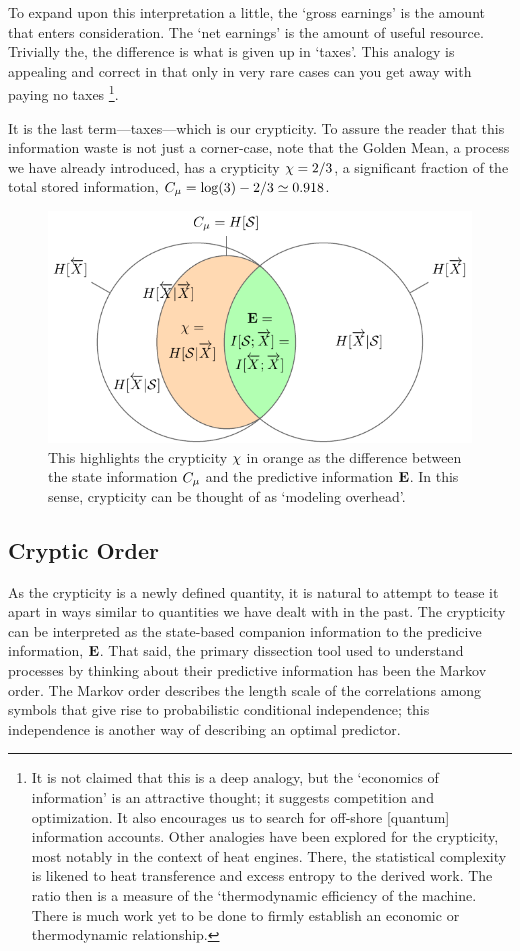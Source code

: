 To expand upon this interpretation a little, the `gross earnings' is the amount that enters consideration. The `net earnings' is the amount of useful resource. Trivially the, the difference is what is given up in `taxes'. This analogy is appealing and correct in that only in very rare cases can you get away with paying no taxes \footnote{It is not claimed that this is a deep analogy, but the `economics of information' is an attractive thought; it suggests competition and optimization. It also encourages us to search for off-shore [quantum] information accounts. Other analogies have been explored for the crypticity, most notably in the context of heat engines. There, the statistical complexity is likened to heat transference and excess entropy to the derived work. The ratio then is a measure of the `thermodynamic efficiency of the machine. There is much work yet to be done to firmly establish an economic or thermodynamic relationship.}.

It is the last term---taxes---which is our crypticity. To assure the reader that this information waste is not just a corner-case, note that the Golden Mean, a process we have already introduced, has a crypticity $\chi = 2/3$, a significant fraction of the total stored information, $C_\mu = \log(3) - 2/3 \simeq 0.918$.

\begin{figure}[h!]
\centering
\includegraphics[scale = 1.0]{../chapter1/figures/tikz/3var_PastFutureS}
\caption{This highlights the crypticity $\chi$ in orange as the difference between the state information $C_\mu$ and the predictive information ${\bf E}$. In this sense, crypticity can be thought of as `modeling overhead'.}
\label{fig:3var_PastFutureS}
\end{figure}

\subsection{Cryptic Order}
As the crypticity is a newly defined quantity, it is natural to attempt to tease it apart in ways similar to quantities we have dealt with in the past. The crypticity can be interpreted as the state-based companion information to the predicive information, ${\bf E}$. That said, the primary dissection tool used to understand processes by thinking about their predictive information has been the Markov order. The Markov order describes the length scale of the correlations among symbols that give rise to probabilistic conditional independence; this independence is another way of describing an optimal predictor.

